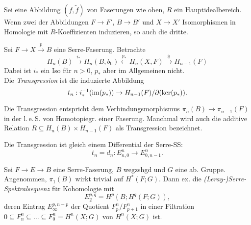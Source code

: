 \documentclass{cheat-sheet}
\newcommand{\leS}{l.\,e.\,S.} %
\begin{document}
\begin{prop}
  Sei eine Abbildung $(f, \tilde{f})$ von Faserungen wie oben, $R$ ein Hauptidealbereich.
  Wenn zwei der Abbildungen $F \to F'$, $B \to B'$ und $X \to X'$ Isomorphismen in Homologie mit $R$-Koeffizienten induzieren, so auch die dritte.
\end{prop}

\begin{defn}
  Sei $F \to X \xrightarrow{p} B$ eine Serre-Faserung. Betrachte
  \[ H_n(B) \xrightarrow{i_*} H_n(B, b_0) \xleftarrow{p_*} H_n(X, F) \xrightarrow{\partial} H_{n-1}(F) \]
  Dabei ist $i_*$ ein Iso für $n > 0$, $p_*$ aber im Allgemeinen nicht. \\
  Die \emph{Transgression} ist die induzierte Abbildung
  \[ t_n : i_*^{-1}(\operatorname{im}(p_*)) \to H_{n-1}(F) / \partial(\ker(p_*)). \]
\end{defn}

\begin{bem}
  Die Transgression entspricht dem Verbindungsmorphismus $\pi_n(B) \to \pi_{n-1}(F)$ in der \leS{} von Homotopiegr. einer Faserung.
  Manchmal wird auch die additive Relation $R \subseteq H_n(B) \times H_{n-1}(F)$ als Transgression bezeichnet.
\end{bem}

\begin{prop}
  Die Transgression ist gleich einem Differential der Serre-SS:
  \[ t_n = d_n : E^{n}_{n,0} \to E^n_{0,n-1}. \]
\end{prop}


\begin{thm}
  Sei $F \to E \to B$ eine Serre-Faserung, $B$ wegzshgd und $G$ eine ab. Gruppe. Angenommen, $\pi_1(B)$ wirkt trivial auf $H^*(F; G)$.
  Dann ex. die \emph{(Leray-)Serre-Spektralsequenz} für Kohomologie mit
  \[ E_2^{p,q} = H^p(B; H^q(F; G)), \]
  deren Eintrag $E_\infty^{p,n-p}$ der Quotient $F_p^n/F_{p+1}^n$ in einer Filtration
  $0 \subseteq F_n^n \subseteq \ldots \subseteq F_0^n = H^n(X; G)$ von $H^n(X; G)$ ist.
\end{thm}
\end{document}
